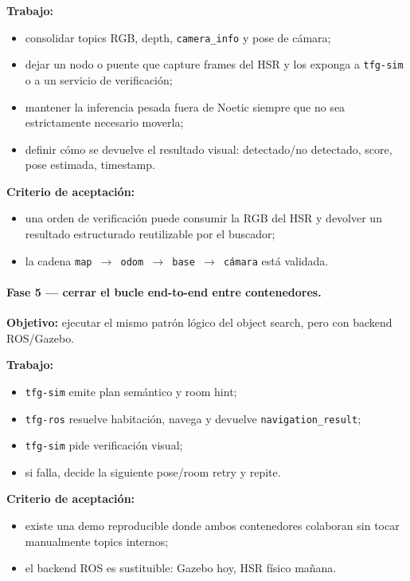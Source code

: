 \documentclass[11pt,a4paper]{article}
\begin{document}
\textbf{Trabajo:}
\begin{itemize}
  \item consolidar topics RGB, depth, \texttt{camera\_info} y pose de cámara;
  \item dejar un nodo o puente que capture frames del HSR y los exponga a
        \texttt{tfg-sim} o a un servicio de verificación;
  \item mantener la inferencia pesada fuera de Noetic siempre que no sea
        estrictamente necesario moverla;
  \item definir cómo se devuelve el resultado visual:
        detectado/no detectado, score, pose estimada, timestamp.
\end{itemize}

\textbf{Criterio de aceptación:}
\begin{itemize}
  \item una orden de verificación puede consumir la RGB del HSR y devolver un
        resultado estructurado reutilizable por el buscador;
  \item la cadena \texttt{map $\rightarrow$ odom $\rightarrow$ base
        $\rightarrow$ cámara} está validada.
\end{itemize}

\paragraph{Fase 5 --- cerrar el bucle end-to-end entre contenedores.}

\textbf{Objetivo:} ejecutar el mismo patrón lógico del object search, pero con
backend ROS/Gazebo.

\textbf{Trabajo:}
\begin{itemize}
  \item \texttt{tfg-sim} emite plan semántico y room hint;
  \item \texttt{tfg-ros} resuelve habitación, navega y devuelve
        \texttt{navigation\_result};
  \item \texttt{tfg-sim} pide verificación visual;
  \item si falla, decide la siguiente pose/room retry y repite.
\end{itemize}

\textbf{Criterio de aceptación:}
\begin{itemize}
  \item existe una demo reproducible donde ambos contenedores colaboran sin
        tocar manualmente topics internos;
  \item el backend ROS es sustituible: Gazebo hoy, HSR físico mañana.
\end{itemize}
\end{document}
